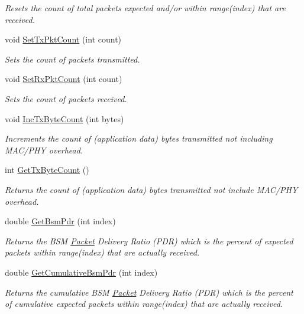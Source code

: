 \begin{DoxyCompactItemize}
\begin{DoxyCompactList}\small\item\em Resets the count of total packets expected and/or within range(index) that are received. \end{DoxyCompactList}\item 
void \hyperlink{classns3_1_1WaveBsmStats_a6975d2d2f109893cc149e5d9df82384e}{Set\+Tx\+Pkt\+Count} (int count)
\begin{DoxyCompactList}\small\item\em Sets the count of packets transmitted. \end{DoxyCompactList}\item 
void \hyperlink{classns3_1_1WaveBsmStats_aa534be08155c8b0b456cb29f8dec845e}{Set\+Rx\+Pkt\+Count} (int count)
\begin{DoxyCompactList}\small\item\em Sets the count of packets received. \end{DoxyCompactList}\item 
void \hyperlink{classns3_1_1WaveBsmStats_a0182274991bdf7cb4e9bb4ae66f587e1}{Inc\+Tx\+Byte\+Count} (int bytes)
\begin{DoxyCompactList}\small\item\em Increments the count of (application data) bytes transmitted not including M\+A\+C/\+P\+HY overhead. \end{DoxyCompactList}\item 
int \hyperlink{classns3_1_1WaveBsmStats_aafacfa2c15950b092cb2045b8b031e69}{Get\+Tx\+Byte\+Count} ()
\begin{DoxyCompactList}\small\item\em Returns the count of (application data) bytes transmitted not include M\+A\+C/\+P\+HY overhead. \end{DoxyCompactList}\item 
double \hyperlink{classns3_1_1WaveBsmStats_aa2efbb19cdc7409323cac2e911be7852}{Get\+Bsm\+Pdr} (int index)
\begin{DoxyCompactList}\small\item\em Returns the B\+SM \hyperlink{classns3_1_1Packet}{Packet} Delivery Ratio (P\+DR) which is the percent of expected packets within range(index) that are actually received. \end{DoxyCompactList}\item 
double \hyperlink{classns3_1_1WaveBsmStats_aa61226c7927e5338c0c3826971783090}{Get\+Cumulative\+Bsm\+Pdr} (int index)
\begin{DoxyCompactList}\small\item\em Returns the cumulative B\+SM \hyperlink{classns3_1_1Packet}{Packet} Delivery Ratio (P\+DR) which is the percent of cumulative expected packets within range(index) that are actually received. \end{DoxyCompactList}\item 

\end{DoxyCompactItemize}
